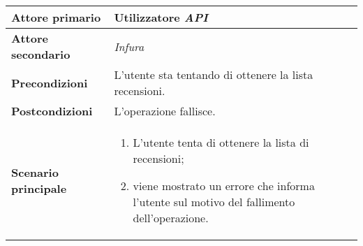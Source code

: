             \begin{center}
                \renewcommand{\arraystretch}{1.5}
                \begin{tabular}{m{10em} m{20em}}
                    \hline
                    \textbf{Attore primario} & Utilizzatore \textit{API} \\
                    \hline
                    \textbf{Attore secondario} & \textit{Infura} \\
                    \hline
                    \textbf{Precondizioni} & L'utente sta tentando di ottenere la lista recensioni. \\
                    \hline
                    \textbf{Postcondizioni} & L'operazione fallisce. \\
                    \hline
                    \textbf{Scenario principale} &
                        \begin{enumerate}
                            \item L'utente tenta di ottenere la lista di recensioni;
                            \item viene mostrato un errore che informa l'utente sul motivo del fallimento
                            dell'operazione.
                        \end{enumerate} \\
                    \hline
                \end{tabular}
            \end{center}

\pagebreak